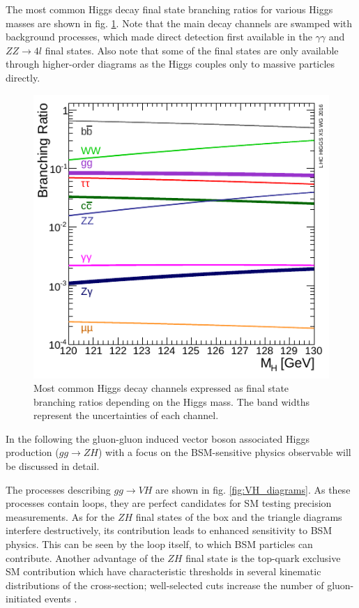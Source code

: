 The most common Higgs decay final state branching ratios for various Higgs masses are shown in fig. \ref{fig:higgsbranch}. Note that the main decay channels are swamped with background processes, which made direct detection first available in the $\gamma\gamma$ and $ZZ\rightarrow4l$ final states. Also note that some of the final states are only available through higher-order diagrams as the Higgs couples only to massive particles directly.

\begin{figure}[h!]
	\centering
	\includegraphics[width=0.6\linewidth]{figures/theory/higgsdecay.pdf}
	\caption{Most common Higgs decay channels expressed as final state branching ratios depending on the Higgs mass. The band widths represent the uncertainties of each channel. \cite{HiggsCrossSections}}
	\label{fig:higgsbranch}
\end{figure}

In the following the gluon-gluon induced vector boson associated Higgs production ($gg\rightarrow ZH$) with a focus on the BSM-sensitive physics observable will be discussed in detail.


The processes describing $gg\rightarrow VH$ are shown in fig. \ref{fig:VH_diagrams}. As these processes contain loops, they are perfect candidates for SM testing precision measurements. As for the $ZH$ final states of the box and the triangle diagrams interfere destructively, its contribution leads to enhanced sensitivity to BSM physics. This can be seen by the loop itself, to which BSM particles can contribute. Another advantage of the $ZH$ final state is the top-quark exclusive SM contribution which have characteristic thresholds in several kinematic distributions of the cross-section; well-selected cuts increase the number of gluon-initiated events \cite{Harlander_2018}.

